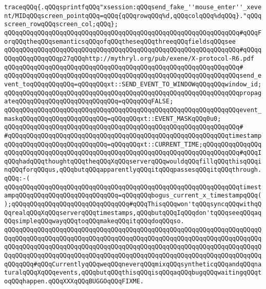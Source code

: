\newline
\verb|traceqQQq{.qQQqsprintfqQQq"xsession:qQQqsend_fake_''mouse_enter''_xevent/MIDqQQqscreen_pointqQQq=qQQq{qQQqrowqQQq%d,qQQqcolqQQq%dqQQq}."qQQqscreen_rowqQQqscreen_col;qQQq};|\newline
\verb|qQQqqQQqqQQqqQQqqQQqqQQqqQQqqQQqqQQqqQQqqQQqqQQqqQQqqQQqqQQqqQQq#qQQqForqQQqtheqQQqsemanticsqQQqofqQQqtheseqQQqthreeqQQqfieldsqQQqsee|\newline
\verb|qQQqqQQqqQQqqQQqqQQqqQQqqQQqqQQqqQQqqQQqqQQqqQQqqQQqqQQqqQQqqQQq#qQQqqQQqqQQqqQQqqQQqp27qQQqhttp://mythryl.org/pub/exene/X-protocol-R6.pdf|\newline
\verb|qQQqqQQqqQQqqQQqqQQqqQQqqQQqqQQqqQQqqQQqqQQqqQQqqQQqqQQqqQQqqQQq#|\newline
\verb|qQQqqQQqqQQqqQQqqQQqqQQqqQQqqQQqqQQqqQQqqQQqqQQqqQQqqQQqqQQqqQQqsend_event_toqQQqqQQqqQQq=qQQqqQQqxt::SEND_EVENT_TO_WINDOWqQQqqQQqwindow_id;|\newline
\verb|qQQqqQQqqQQqqQQqqQQqqQQqqQQqqQQqqQQqqQQqqQQqqQQqqQQqqQQqqQQqqQQqpropagateqQQqqQQqqQQqqQQqqQQqqQQqqQQq=qQQqqQQqFALSE;|\newline
\verb|qQQqqQQqqQQqqQQqqQQqqQQqqQQqqQQqqQQqqQQqqQQqqQQqqQQqqQQqqQQqqQQqevent_maskqQQqqQQqqQQqqQQqqQQqqQQq=qQQqqQQqxt::EVENT_MASKqQQq0u0;|\newline
\verb|qQQqqQQqqQQqqQQqqQQqqQQqqQQqqQQqqQQqqQQqqQQqqQQqqQQqqQQqqQQqqQQq#|\newline
\verb|#qQQqqQQqqQQqqQQqqQQqqQQqqQQqqQQqqQQqqQQqqQQqqQQqqQQqqQQqqQQqtimestampqQQqqQQqqQQqqQQqqQQqqQQqqQQq=qQQqqQQqxt::CURRENT_TIME;qQQqqQQqqQQqqQQqqQQqqQQqqQQqqQQqqQQqqQQqqQQqqQQqqQQqqQQqqQQqqQQqqQQqqQQqqQQqqQQq#qQQqIqQQqhadqQQqthoughtqQQqtheqQQqXqQQqserverqQQqwouldqQQqfillqQQqthisqQQqinqQQqforqQQqus,qQQqbutqQQqapparentlyqQQqitqQQqpassesqQQqitqQQqthrough.qQQq:-(|\newline
\verb|qQQqqQQqqQQqqQQqqQQqqQQqqQQqqQQqqQQqqQQqqQQqqQQqqQQqqQQqqQQqqQQqtimestampqQQqqQQqqQQqqQQqqQQqqQQqqQQq=qQQqqQQqbogus_current_x_timestampqQQq();qQQqqQQqqQQqqQQqqQQqqQQqqQQqqQQq#qQQqThisqQQqwon'tqQQqsyncqQQqwithqQQqrealqQQqXqQQqserverqQQqtimestamps,qQQqbutqQQqIqQQqdon'tqQQqseeqQQqaqQQqsimpleqQQqwayqQQqtoqQQqmakeqQQqitqQQqdoqQQqso.|\newline
\verb|qQQqqQQqqQQqqQQqqQQqqQQqqQQqqQQqqQQqqQQqqQQqqQQqqQQqqQQqqQQqqQQqqQQqqQQqqQQqqQQqqQQqqQQqqQQqqQQqqQQqqQQqqQQqqQQqqQQqqQQqqQQqqQQqqQQqqQQqqQQqqQQqqQQqqQQqqQQqqQQqqQQqqQQqqQQqqQQqqQQqqQQqqQQqqQQqqQQqqQQqqQQqqQQqqQQqqQQqqQQqqQQqqQQqqQQqqQQqqQQqqQQqqQQqqQQqqQQqqQQqqQQqqQQqqQQqqQQqqQQqqQQqqQQq#qQQqCurrentlyqQQqweqQQqneverqQQqmixqQQqsyntheticqQQqandqQQqnaturalqQQqXqQQqevents,qQQqbutqQQqthisqQQqisqQQqaqQQqbugqQQqwaitingqQQqtoqQQqhappen.qQQqXXXqQQqBUGGOqQQqFIXME.|\newline
